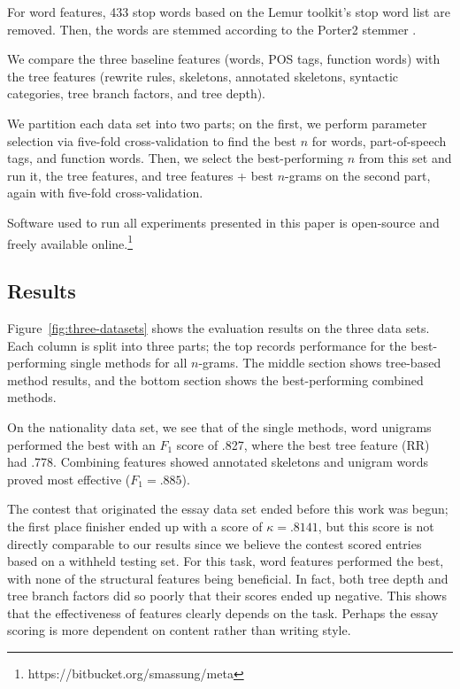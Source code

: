 \documentclass[conference]{IEEEtran}
\begin{document}
For word features, 433 stop words based on the Lemur toolkit's \cite{lemur}
stop word list are removed.  Then, the words are stemmed according to the
Porter2 stemmer \cite{porter2}.

We compare the three baseline features (words, POS tags, function
words) with the tree features (rewrite rules, skeletons, annotated
skeletons, syntactic categories, tree branch factors, and tree depth).

We partition each data set into two parts; on the first, we perform parameter
selection via five-fold cross-validation to find the best $n$ for words,
part-of-speech tags, and function words. Then, we select the best-performing $n$
from this set and run it, the tree features, and tree features + best $n$-grams
on the second part, again with five-fold cross-validation.

Software used to run all experiments presented in this paper is open-source and
freely available online.\footnote{https://bitbucket.org/smassung/meta}

\subsection{Results}

Figure~\ref{fig:three-datasets} shows the evaluation results on the three data
sets. Each column is split into three parts; the top records performance for the
best-performing single methods for all $n$-grams. The middle section shows
tree-based method results, and the bottom section shows the best-performing
combined methods.

On the nationality data set, we see that of the single methods, word unigrams
performed the best with an $F_1$ score of .827, where the best tree feature (RR)
had .778. Combining features showed annotated skeletons and unigram words proved
most effective ($F_1 = .885$). 

The contest that originated the essay data set ended before this work was begun;
the first place finisher ended up with a score of $\kappa =.8141$, but this
score is not directly comparable to our results since we believe the contest
scored entries based on a withheld testing set. For this task, word features
performed the best, with none of the structural features being beneficial. In
fact, both tree depth and tree branch factors did so poorly that their scores
ended up negative.  This shows that the effectiveness of features clearly
depends on the task. Perhaps the essay scoring is more dependent on content
rather than writing style.
\end{document}
